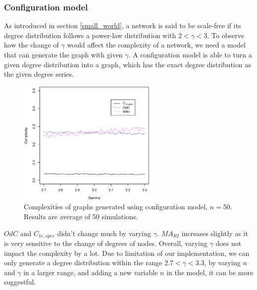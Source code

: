 \documentclass[12pt]{article}
\begin{document}
\subsubsection{Configuration model}
\label{configuration_model}
As introduced in section \ref{small_world}, a network is said to be scale-free if its degree distribution follows a power-law distribution with $2<\gamma <3$. To observe how the change of $\gamma$ would affect the complexity of a network, we need a model that can generate the graph with given $\gamma$. A configuration model \cite{newmanbook} is able to turn a given degree distribution into a graph, which has the exact degree distribution as the given degree series. 
\begin{figure}[h]
    \centering
    \includegraphics[width=0.6\textwidth]{configuration_model.eps}
    \caption{Complexities of graphs generated using configuration model, $n=50$. Results are average of 50 simulations.}
    \label{fig:configuration_model}
\end{figure}
\par
$OdC$ and $C_{1e,spec}$ didn't change much by varying $\gamma$. $MA_{RI}$ increases slightly as it is very sensitive to the change of degrees of nodes. Overall, varying $\gamma$ does not impact the complexity by a lot. Due to limitation of our implementation, we can only generate a degree distribution within the range $2.7<\gamma<3.3$, by varying $n$ and $\gamma$ in a larger range, and adding a new variable $n$ in the model, it can be more suggestful. 
\end{document}
